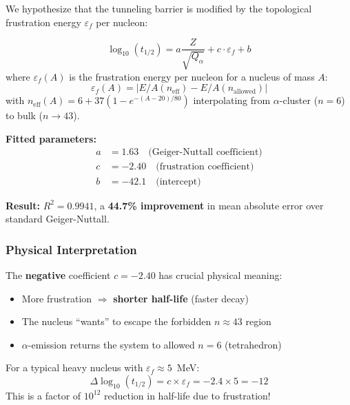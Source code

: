 We hypothesize that the tunneling barrier is modified by the topological frustration energy $\varepsilon_f$ per nucleon:

\begin{tcolorbox}[colback=green!5!white, colframe=green!75!black, title=Frustration-Corrected Geiger-Nuttall Law {[I]}]
\begin{equation}
    \log_{10}(t_{1/2}) = a \frac{Z}{\sqrt{Q_\alpha}} + c \cdot \varepsilon_f + b
    \label{eq:geiger-nuttall-frustration}
\end{equation}
where $\varepsilon_f(A)$ is the frustration energy per nucleon for a nucleus of mass $A$:
\begin{equation}
    \varepsilon_f(A) = \left| E/A(n_{\text{eff}}) - E/A(n_{\text{allowed}}) \right|
\end{equation}
with $n_{\text{eff}}(A) = 6 + 37(1 - e^{-(A-20)/80})$ interpolating from $\alpha$-cluster ($n=6$) to bulk ($n \to 43$).
\end{tcolorbox}

\textbf{Fitted parameters:}
\begin{align}
    a &= 1.63 \quad \text{(Geiger-Nuttall coefficient)} \nonumber \\
    c &= -2.40 \quad \text{(frustration coefficient)} \nonumber \\
    b &= -42.1 \quad \text{(intercept)}
\end{align}

\textbf{Result:} $R^2 = 0.9941$, a \textbf{44.7\% improvement} in mean absolute error over standard Geiger-Nuttall.

\subsubsection{Physical Interpretation}

The \textbf{negative} coefficient $c = -2.40$ has crucial physical meaning:
\begin{itemize}
    \item More frustration $\Rightarrow$ \textbf{shorter half-life} (faster decay)
    \item The nucleus ``wants'' to escape the forbidden $n \approx 43$ region
    \item $\alpha$-emission returns the system to allowed $n = 6$ (tetrahedron)
\end{itemize}

For a typical heavy nucleus with $\varepsilon_f \approx 5$~MeV:
\begin{equation}
    \Delta \log_{10}(t_{1/2}) = c \times \varepsilon_f = -2.4 \times 5 = -12
\end{equation}
This is a factor of $10^{12}$ reduction in half-life due to frustration!

